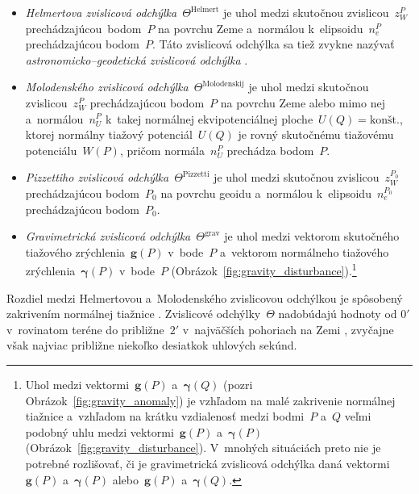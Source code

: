 \documentclass[a4paper,12pt]{book}
\let\vec\mathbf
\begin{document}
\begin{itemize}
\item \emph{Helmertova zvislicová odchýlka}~$\Theta^\mathrm{Helmert}$ je uhol 
medzi skutočnou zvislicou~$z_W^P$ prechádzajúcou~bodom~$P$ na povrchu Zeme 
a~normálou k~elipsoidu~$n_e^P$ prechádzajúcou bodom~$P$.  Táto zvislicová 
odchýlka sa tiež zvykne nazývať \textit{astronomicko--geodetická zvislicová 
odchýlka} \parencite{Jekeli1999b}.

\item \emph{Molodenského zvislicová odchýlka}~$\Theta^\mathrm{Molodenskij}$ je 
uhol medzi skutočnou zvislicou~$z_W^P$ prechádzajúcou bodom~$P$ na povrchu Zeme 
alebo mimo nej a~normálou~$n_U^P$ k~takej normálnej ekvipotenciálnej 
ploche~$U(Q) = \textrm{kon\v{s}t.}$, ktorej normálny tiažový potenciál~$U(Q)$ 
je rovný skutočnému tiažovému potenciálu~$W(P)$, pričom normála~$n_U^P$ 
prechádza bodom~$P$.

\item \emph{Pizzettiho zvislicová odchýlka}~$\Theta^\mathrm{Pizzetti}$ je uhol 
medzi skutočnou zvislicou~$z_W^{P_0}$ prechádzajúcou bodom~$P_0$ na povrchu 
geoidu a~normálou k~elipsoidu~$n_e^{P_0}$ prechádzajúcou bodom~$P_0$.

\item \emph{Gravimetrická zvislicová odchýlka}~$\Theta^\mathrm{grav}$ je uhol 
medzi vektorom skutočného tiažového zrýchlenia~$\vec g(P)$ v~bode~$P$ 
a~vektorom normálneho tiažového zrýchlenia~$\boldsymbol\gamma(P)$ v~bode~$P$ 
(Obrázok~\ref{fig:gravity_disturbance}).\footnote{Uhol medzi vektormi~$\vec 
g(P)$ a~$\boldsymbol\gamma(Q)$ (pozri Obrázok~\ref{fig:gravity_anomaly}) je 
vzhľadom na malé zakrivenie normálnej tiažnice a~vzhľadom na krátku vzdialenosť 
medzi bodmi~$P$ a~$Q$ veľmi podobný uhlu medzi vektormi~$\vec g(P)$ 
a~$\boldsymbol\gamma(P)$ (Obrázok~\ref{fig:gravity_disturbance}).  V~mnohých 
situáciách preto nie je potrebné rozlišovať, či je gravimetrická zvislicová 
odchýlka daná vektormi~$\vec g(P)$ a~$\boldsymbol\gamma(P)$ alebo~$\vec g(P)$ 
a~$\boldsymbol\gamma(Q)$.}
\end{itemize}
%
Rozdiel medzi Helmertovou a~Molodenského zvislicovou odchýlkou je spôsobený 
zakrivením normálnej tiažnice \parencite{Jekeli1999b}.  Zvislicové 
odchýlky~$\Theta$ nadobúdajú hodnoty od $0'$ v~rovinatom teréne do 
približne~$2'$ v~najväčších pohoriach na Zemi \parencite{GGMplus}, zvyčajne 
však najviac približne niekoľko desiatkok uhlových sekúnd.
\end{document}
